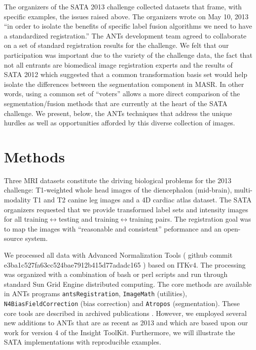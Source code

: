 \documentclass{llncs}
\begin{document}
The organizers of the SATA 2013 challenge collected datasets that
frame, with specific examples, the issues raised above.  The
organizers wrote on May 10, 2013 ``in order to isolate the benefits of
specific label fusion algorithms we need to have a standardized
registration.''  The ANTs development team agreed to collaborate on a set of standard registration results for the challenge.  We
felt that our participation was important due to the variety of the challenge
data, the fact that not all entrants are biomedical image registration
experts and the results of SATA 2012 which suggested that a common
transformation basis set would help isolate the differences between
the segmentation component in MASR.  In other words, using a common
set of ``voters'' allows a more direct comparison of the
segmentation/fusion methods that are currently at the heart of the
SATA challenge. We present,
below, the ANTs techniques that address the unique hurdles as well as
opportunities afforded by this diverse collection of images.

\section{Methods} 
Three MRI datasets constitute the driving biological problems for the
2013 challenge: T1-weighted whole head images of the diencephalon
(mid-brain), multi-modality T1 and T2 canine leg images and a 4D
cardiac atlas dataset.  The SATA organizers requested that we provide
transformed label sets and intensity images for all
training$\leftrightarrow$testing and training$\leftrightarrow$training
pairs.  The registration goal was to map the images with ``reasonable
and consistent'' peformance and an open-source system.  

We processed all data with Advanced Normalization Tools ( github
commit e3ba1c527fa63cc524bae7912b415d77adadc165 ) based on ITKv4.  The
processing was organized with a combination of bash or perl scripts
and run through standard Sun Grid Engine distributed computing.
The core methods are available in ANTs programs
\texttt{antsRegistration}, \texttt{ImageMath} (utilities),
\texttt{N4BiasFieldCorrection} (bias correction) and \texttt{Atropos}
(segmentation).  These core tools are described in archived
publications \cite{}.  However, we employed several new additions to
ANTs that are as recent as 2013 and which are based upon our work for
version 4 of the Insight ToolKit.  Furthermore, we will illustrate the
SATA implementations with reproducible examples.
\end{document}
